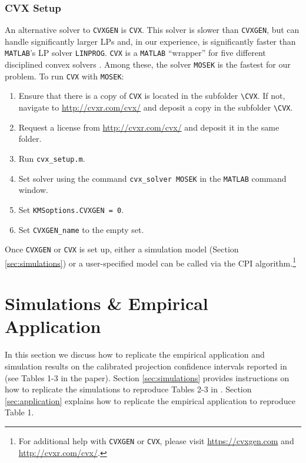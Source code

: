 \documentclass[12pt]{article}
\def\code#1{\texttt{#1}}
\begin{document}
\subsubsection{CVX Setup}
An alternative solver to \code{CVXGEN} is \code{CVX}.  This solver is slower than \code{CVXGEN}, but can handle significantly larger LPs and, in our experience, is significantly faster than \code{MATLAB}'s LP solver \code{LINPROG}.  \code{CVX} is a \code{MATLAB} ``wrapper'' for five different disciplined convex solvers \cite{cvx,gb08}.  Among these, the solver \code{MOSEK} is the fastest for our problem.  To run \code{CVX} with \code{MOSEK}:
\begin{enumerate}
\item Ensure that there is a copy of \code{CVX} is located in the subfolder \code{\textbackslash CVX}.  If not, navigate to \url{http://cvxr.com/cvx/} and deposit a copy in the subfolder \code{\textbackslash CVX}.
\item Request a license from  \url{http://cvxr.com/cvx/} and deposit it in the same folder.
\item Run \code{cvx\_setup.m}.
\item Set solver using the command \code{cvx\_solver MOSEK} in the \code{MATLAB} command window.
\item Set \code{KMSoptions.CVXGEN = 0}.
\item Set  \code{CVXGEN\_name} to the empty set.
\end{enumerate}
Once \code{CVXGEN} or \code{CVX} is set up, either a simulation model (Section \ref{sec:simulations}) or a user-specified model  can be called via the CPI algorithm.\footnote{For additional help with \code{CVXGEN} or \code{CVX}, please visit   \url{https://cvxgen.com} and \url{http://cvxr.com/cvx/}.}

\section{Simulations \& Empirical Application}\label{sec:replicating}
 In this section we discuss how to replicate the empirical application and simulation results on the calibrated projection confidence intervals reported  in  (see Tables 1-3 in the paper).   Section \ref{sec:simulations} provides instructions on how to replicate the simulations to reproduce  Tables 2-3 in . Section \ref{sec:application} explains how to replicate the empirical application to reproduce Table 1.
\end{document}
